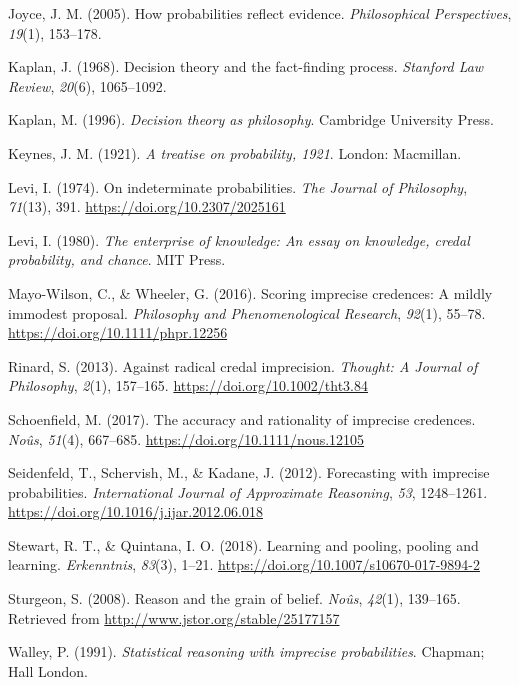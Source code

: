 \documentclass[
  10pt,
  dvipsnames,enabledeprecatedfontcommands]{scrartcl}
\newlength{\cslhangindent}
\newlength{\cslentryspacingunit} %
\newenvironment{CSLReferences}[2] %
 {%
  \setlength{\parindent}{0pt}
  \ifodd #1
  \let\oldpar\par
  \def\par{\hangindent=\cslhangindent\oldpar}
  \fi
  \setlength{\parskip}{#2\cslentryspacingunit}
 }%
 {}
\begin{document}
\begin{CSLReferences}{1}{0}
\leavevmode{}%
Joyce, J. M. (2005). How probabilities reflect evidence.
\emph{Philosophical Perspectives}, \emph{19}(1), 153--178.

\leavevmode{}%
Kaplan, J. (1968). Decision theory and the fact-finding process.
\emph{Stanford Law Review}, \emph{20}(6), 1065--1092.

\leavevmode{}%
Kaplan, M. (1996). \emph{Decision theory as philosophy}. Cambridge
University Press.

\leavevmode{}%
Keynes, J. M. (1921). \emph{A treatise on probability, 1921}. London:
Macmillan.

\leavevmode{}%
Levi, I. (1974). On indeterminate probabilities. \emph{The Journal of
Philosophy}, \emph{71}(13), 391. \url{https://doi.org/10.2307/2025161}

\leavevmode{}%
Levi, I. (1980). \emph{The enterprise of knowledge: An essay on
knowledge, credal probability, and chance}. MIT Press.

\leavevmode{}%
Mayo-Wilson, C., \& Wheeler, G. (2016). Scoring imprecise credences: A
mildly immodest proposal. \emph{Philosophy and Phenomenological
Research}, \emph{92}(1), 55--78.
\url{https://doi.org/10.1111/phpr.12256}

\leavevmode{}%
Rinard, S. (2013). Against radical credal imprecision. \emph{Thought: A
Journal of Philosophy}, \emph{2}(1), 157--165.
\url{https://doi.org/10.1002/tht3.84}

\leavevmode{}%
Schoenfield, M. (2017). The accuracy and rationality of imprecise
credences. \emph{Noûs}, \emph{51}(4), 667--685.
\url{https://doi.org/10.1111/nous.12105}

\leavevmode{}%
Seidenfeld, T., Schervish, M., \& Kadane, J. (2012). Forecasting with
imprecise probabilities. \emph{International Journal of Approximate
Reasoning}, \emph{53}, 1248--1261.
\url{https://doi.org/10.1016/j.ijar.2012.06.018}

\leavevmode{}%
Stewart, R. T., \& Quintana, I. O. (2018). Learning and pooling, pooling
and learning. \emph{Erkenntnis}, \emph{83}(3), 1--21.
\url{https://doi.org/10.1007/s10670-017-9894-2}

\leavevmode{}%
Sturgeon, S. (2008). Reason and the grain of belief. \emph{No{û}s},
\emph{42}(1), 139--165. Retrieved from
\url{http://www.jstor.org/stable/25177157}

\leavevmode{}%
Walley, P. (1991). \emph{Statistical reasoning with imprecise
probabilities}. Chapman; Hall London.

\end{CSLReferences}
\end{document}
